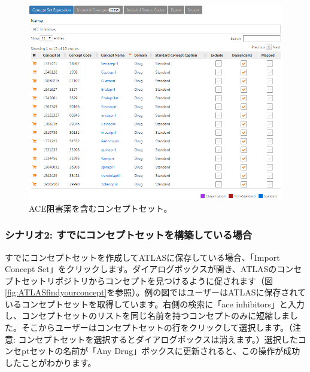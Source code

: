 \documentclass[
  11pt]{book}
\theoremstyle{definition}
\theoremstyle{definition}
\theoremstyle{definition}
\theoremstyle{definition}
\theoremstyle{remark}
\begin{document}
\begin{figure}

{\centering \includegraphics[width=1\linewidth]{images/Cohorts/aceConceptSetExpression} 

}

\caption{ACE阻害薬を含むコンセプトセット。}\label{fig:aceConceptSetExpression}
\end{figure}

\subsubsection*{シナリオ2: すでにコンセプトセットを構築している場合}\label{ux30b7ux30caux30eaux30aa2-ux3059ux3067ux306bux30b3ux30f3ux30bbux30d7ux30c8ux30bbux30c3ux30c8ux3092ux69cbux7bc9ux3057ux3066ux3044ux308bux5834ux5408}

すでにコンセプトセットを作成してATLASに保存している場合、「Import Concept Set」をクリックします。ダイアログボックスが開き、ATLASのコンセプトセットリポジトリからコンセプトを見つけるように促されます（図\ref{fig:ATLASfindyourconcept}を参照）。例の図ではユーザーはATLASに保存されているコンセプトセットを取得しています。右側の検索に「ace inhibitors」と入力し、コンセプトセットのリストを同じ名前を持つコンセプトのみに短縮しました。そこからユーザーはコンセプトセットの行をクリックして選択します。（注意: コンセプトセットを選択するとダイアログボックスは消えます。）選択したコンセptセットの名前が「Any Drug」ボックスに更新されると、この操作が成功したことがわかります。
\end{document}
